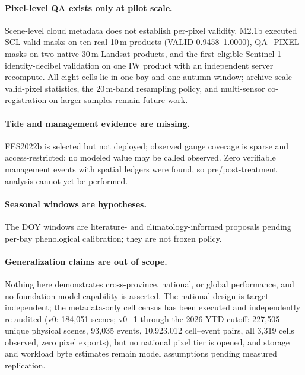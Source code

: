 \paragraph{Pixel-level QA exists only at pilot scale.}
Scene-level cloud metadata does not establish per-pixel validity.
M2.1b executed SCL valid masks on ten real 10\,m products (VALID
0.9458--1.0000), QA\_PIXEL masks on two native-30\,m Landsat products,
and the first eligible Sentinel-1 identity-decibel validation on one
IW product with an independent server recompute. All eight cells lie in
one bay and one autumn window; archive-scale valid-pixel statistics,
the 20\,m-band resampling policy, and multi-sensor co-registration on
larger samples remain future work.

\paragraph{Tide and management evidence are missing.}
FES2022b is selected but not deployed; observed gauge coverage is
sparse and access-restricted; no modeled value may be called observed.
Zero verifiable management events with spatial ledgers were found, so
pre/post-treatment analysis cannot yet be performed.

\paragraph{Seasonal windows are hypotheses.}
The DOY windows are literature- and climatology-informed proposals
pending per-bay phenological calibration; they are not frozen policy.

\paragraph{Generalization claims are out of scope.}
Nothing here demonstrates cross-province, national, or global
performance, and no foundation-model capability is asserted. The
national design is target-independent; the metadata-only cell census
has been executed and independently re-audited (v0: 184{,}051 scenes;
v0\_1 through the 2026 YTD cutoff: 227{,}505 unique physical scenes,
93{,}035 events, 10{,}923{,}012 cell--event pairs, all 3{,}319 cells
observed, zero pixel exports), but no national pixel tier is opened,
and storage and workload byte estimates remain model assumptions
pending measured replication.
